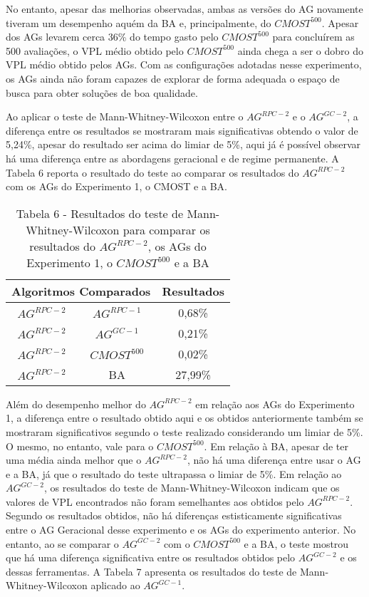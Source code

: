 No entanto, apesar das melhorias observadas, ambas as versões do AG novamente tiveram um desempenho aquém da BA e, principalmente, do $CMOST^500$. Apesar dos AGs levarem cerca 36\% do tempo gasto pelo $CMOST^500$ para concluírem as 500 avaliações, o VPL médio obtido pelo $CMOST^500$ ainda chega a ser o dobro do VPL médio obtido pelos AGs. Com as configurações adotadas nesse experimento, os AGs ainda não foram capazes de explorar de forma adequada o espaço de busca para obter soluções de boa qualidade. 

Ao aplicar o teste de Mann-Whitney-Wilcoxon entre o $AG^{RPC-2}$ e o $AG^{GC-2}$, a diferença entre os resultados se mostraram mais significativas obtendo o valor de 5,24\%, apesar do resultado ser acima do limiar de 5\%, aqui já é possível observar há uma diferença entre as abordagens geracional e de regime permanente. A Tabela 6 reporta o resultado do teste ao comparar os resultados do $AG^{RPC-2}$ com os AGs do Experimento 1, o CMOST e a BA. 

\begin{table}[H]
\centering
\caption{Tabela 6 - Resultados do teste de Mann-Whitney-Wilcoxon para comparar os resultados do $AG^{RPC-2}$, os AGs do Experimento 1, o $CMOST^500$ e a BA}

\begin{tabular}{|c|c|c|}
\hline
\multicolumn{2}{|c|}{Algoritmos Comparados} & Resultados \\ \hline
$AG^{RPC-2}$ & $AG^{RPC-1}$ & 0,68\% \\ \hline
$AG^{RPC-2}$ & $AG^{GC-1}$ & 0,21\% \\ \hline
$AG^{RPC-2}$ & $CMOST^500$ & 0,02\% \\ \hline
$AG^{RPC-2}$ & BA & 27,99\% \\ \hline


\end{tabular}
\end{table}

Além do desempenho melhor do $AG^{RPC-2}$ em relação aos AGs do Experimento 1, a diferença entre o resultado obtido aqui e os obtidos anteriormente também se mostraram significativos segundo o teste realizado considerando um limiar de 5\%. O mesmo, no entanto, vale para o $CMOST^500$. Em relação à BA, apesar de ter uma média ainda melhor que o $AG^{RPC-2}$, não há uma diferença entre usar o AG e a BA, já que o resultado do teste ultrapassa o limiar de 5\%. Em relação ao $AG^{GC-2}$, os resultados do teste de Mann-Whitney-Wilcoxon indicam que os valores de VPL encontrados não foram semelhantes aos obtidos pelo $AG^{RPC-2}$. Segundo os resultados obtidos, não há diferenças estisticamente significativas entre o AG Geracional desse experimento e os AGs do experimento anterior. No entanto, ao se comparar o $AG^{GC-2}$ com o $CMOST^500$ e a BA, o teste mostrou que há uma diferença significativa entre os resultados obtidos pelo $AG^{GC-2}$ e os dessas ferramentas. A Tabela 7 apresenta os resultados do teste de Mann-Whitney-Wilcoxon aplicado ao $AG^{GC-1}$.

